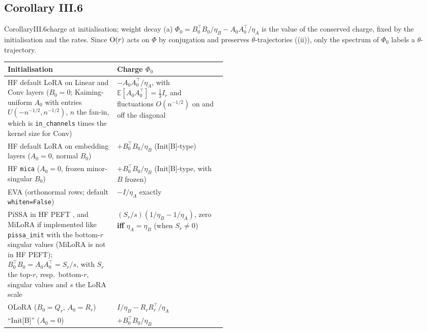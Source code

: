 \subsection{Corollary III.6}\label{proof:III.6}

\begin{restate}{Corollary}{III.6}{charge at initialisation; weight decay}
(a) $\Phi_0=B_0^\top B_0/\eta_B-A_0A_0^\top/\eta_A$ is the value of the conserved charge, fixed by the initialisation and
the rates. Since $\mathrm{O}(r)$ acts on $\Phi$ by conjugation and preserves $\theta$-trajectories ((ii)),
only the spectrum of $\Phi_0$ labels a $\theta$-trajectory.

\smallskip
{\upshape\small\renewcommand{\arraystretch}{1.12}\noindent
\begin{tabularx}{\linewidth}{@{}>{\raggedright\arraybackslash}p{0.5\linewidth}>{\raggedright\arraybackslash}X@{}}
\toprule\headrow
\textbf{Initialisation} & \textbf{Charge $\Phi_0$}\\
\midrule
HF default LoRA on Linear and Conv layers ($B_0=0$; Kaiming-uniform $A_0$ with entries $U(-n^{-1/2},n^{-1/2})$, $n$ the fan-in, which is \texttt{in\_channels} times the kernel size for Conv) & $-A_0A_0^\top/\eta_A$, with $\mathbb{E}[A_0A_0^\top]=\tfrac13I_r$ and fluctuations $O(n^{-1/2})$ on and off the diagonal\\
HF default LoRA on embedding layers ($A_0=0$, normal $B_0$) & $+B_0^\top B_0/\eta_B$ (Init[B]-type)\\
HF \texttt{mica} \citep{rudiger2026mica} ($A_0=0$, frozen minor-singular $B_0$) & $+B_0^\top B_0/\eta_B$ (Init[B]-type, with $B$ frozen)\\
EVA \citep{paischer2024parameter} (orthonormal rows; default \texttt{whiten=False}) & $-I/\eta_A$ exactly\\
PiSSA in HF PEFT \citep{meng2024pissa}, and MiLoRA \citep{wang2024milora} if implemented like \texttt{pissa\_init} with the bottom-$r$ singular values (MiLoRA is not in HF PEFT); $B_0^\top B_0=A_0A_0^\top=S_r/s$, with $S_r$ the top-$r$, resp.\ bottom-$r$, singular values and $s$ the LoRA scale & $(S_r/s)(1/\eta_B-1/\eta_A)$, zero \textbf{iff} $\eta_A=\eta_B$ (when $S_r\ne0$)\\
OLoRA \citep{buyukakyuz2024olora} ($B_0=Q_r$, $A_0=R_r$) & $I/\eta_B-R_rR_r^\top/\eta_A$\\
``Init[B]'' \citep{hayou2024impact} ($A_0=0$) & $+B_0^\top B_0/\eta_B$\\
\bottomrule
\end{tabularx}}
\smallskip


\end{restate}
